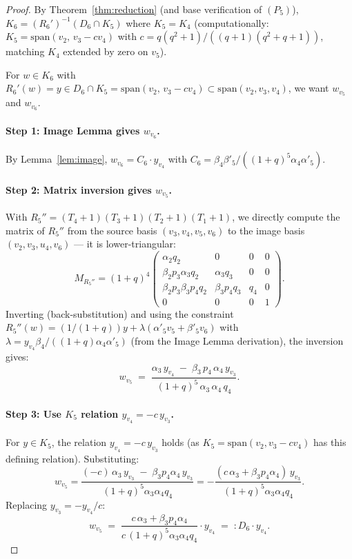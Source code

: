 \documentclass[11pt]{article}
\theoremstyle{definition}
\begin{document}
\begin{proof}
By Theorem~\ref{thm:reduction} (and base verification of $(P_5)$),
$K_6 = (R_6')^{-1}(D_6 \cap K_5)$ where $K_5 = K_4$ (computationally:
$K_5 = \mathrm{span}(v_2,\, v_3 - c v_4)$ with $c = q(q^2+1)/((q+1)(q^2+q+1))$,
matching $K_4$ extended by zero on $v_5$).

For $w \in K_6$ with $R_6'(w) = y \in D_6 \cap K_5
= \mathrm{span}(v_2,\, v_3 - c v_4) \subset \mathrm{span}(v_2,v_3,v_4)$, we
want $w_{v_5}$ and $w_{v_6}$.

\paragraph{Step 1: Image Lemma gives $w_{v_6}$.}
By Lemma~\ref{lem:image}, $w_{v_6} = C_6 \cdot y_{v_4}$
with $C_6 = \beta_4 \beta'_5 / ((1+q)^5 \alpha_4 \alpha'_5)$.

\paragraph{Step 2: Matrix inversion gives $w_{v_5}$.}
With $R_5'' = (T_4+1)(T_3+1)(T_2+1)(T_1+1)$, we directly compute
the matrix of $R_5''$ from the source basis $(v_3, v_4, v_5, v_6)$
to the image basis $(v_2, v_3, u_4, v_6)$ — it is lower-triangular:
\[
M_{R_5''} = (1+q)^4 \begin{pmatrix}
\alpha_2 q_2 & 0 & 0 & 0 \\
\beta_2 p_3 \alpha_3 q_2 & \alpha_3 q_3 & 0 & 0 \\
\beta_2 p_3 \beta_3 p_4 q_2 & \beta_3 p_4 q_3 & q_4 & 0 \\
0 & 0 & 0 & 1
\end{pmatrix}.
\]
Inverting (back-substitution) and using the constraint
$R_5''(w) = (1/(1+q))y + \lambda(\alpha'_5 v_5 + \beta'_5 v_6)$ with
$\lambda = y_{v_4}\beta_4/((1+q)\alpha_4\alpha'_5)$ (from the Image
Lemma derivation), the inversion gives:
\begin{equation}\label{eq:n6-w-v5}
   w_{v_5} \;=\; \frac{\alpha_3 \, y_{v_4} \;-\; \beta_3 \, p_4 \, \alpha_4 \, y_{v_3}}
                       {(1+q)^5 \, \alpha_3 \, \alpha_4 \, q_4}.
\end{equation}

\paragraph{Step 3: Use $K_5$ relation $y_{v_4} = -c \, y_{v_3}$.}
For $y \in K_5$, the relation $y_{v_4} = -c \, y_{v_3}$ holds (as
$K_5 = \mathrm{span}(v_2, v_3 - c v_4)$ has this defining relation).
Substituting:
\[
   w_{v_5} = \frac{(-c)\,\alpha_3 \, y_{v_3} \;-\; \beta_3 p_4 \alpha_4 \, y_{v_3}}
                  {(1+q)^5 \alpha_3 \alpha_4 q_4}
           = -\frac{(c \, \alpha_3 + \beta_3 p_4 \alpha_4)\, y_{v_3}}
                  {(1+q)^5 \alpha_3 \alpha_4 q_4}.
\]
Replacing $y_{v_3} = -y_{v_4}/c$:
\begin{equation}\label{eq:n6-w-v5-final}
   w_{v_5} \;=\; \frac{c \, \alpha_3 + \beta_3 p_4 \alpha_4}
                       {c \, (1+q)^5 \alpha_3 \alpha_4 q_4} \cdot y_{v_4}
            \;=\;: D_6 \cdot y_{v_4}.
\end{equation}


\end{proof}
\end{document}
